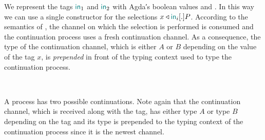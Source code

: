 \begin{AgdaAlign}
We represent the tags $\mathsf{\color{teal}in}_1$ and $\mathsf{\color{teal}in}_2$ with Agda′s boolean values
 and . In this
way we can use a single constructor  for the
selections $\Select\x{\InTag_i}.P$. According to the semantics of \Calculus, the
channel on which the selection is performed is consumed and the continuation
process uses a fresh continuation channel. As a consequence, the type of the
continuation channel, which is either $A$ or $B$ depending on the value of the
tag $x$, is \emph{prepended} in front of the typing context used to type the
continuation process.

\begin{code}%
%
\>[3]%
\>[13]\AgdaSymbol{:}%
\>[1559I]\AgdaSpace{}%
\AgdaSpace{}%
\AgdaSpace{}%
\AgdaSymbol{\}}\AgdaSpace{}%
\AgdaSymbol{(}\AgdaSpace{}%
\AgdaSymbol{:}\AgdaSpace{}%
\AgdaSpace{}%
\AgdaSpace{}%
\AgdaSpace{}%
\AgdaOperator{\AgdaInductiveConstructor{\&}}\AgdaSpace{}%
\AgdaSpace{}%
\AgdaOperator{\AgdaFunction{,}}\AgdaSpace{}%
\AgdaSymbol{)}\AgdaSpace{}%
\<%
\\
\>[.][@{}l@{}]\<[1559I]%
\>[15]\AgdaSpace{}%
\AgdaSymbol{(}\AgdaSpace{}%
\AgdaSpace{}%
\AgdaSymbol{)}\AgdaSpace{}%
\AgdaSpace{}%
\AgdaSpace{}%
\AgdaSymbol{(}\AgdaSpace{}%
\AgdaSpace{}%
\AgdaSymbol{)}\AgdaSpace{}%
\AgdaSpace{}%
\AgdaSpace{}%
\<%
\end{code}

A  process has two possible continuations. Note
again that the continuation channel, which is received along with the tag, has
either type $A$ or type $B$ depending on the tag and its type is prepended to
the typing context of the continuation process since it is the newest channel.


\end{AgdaAlign}

